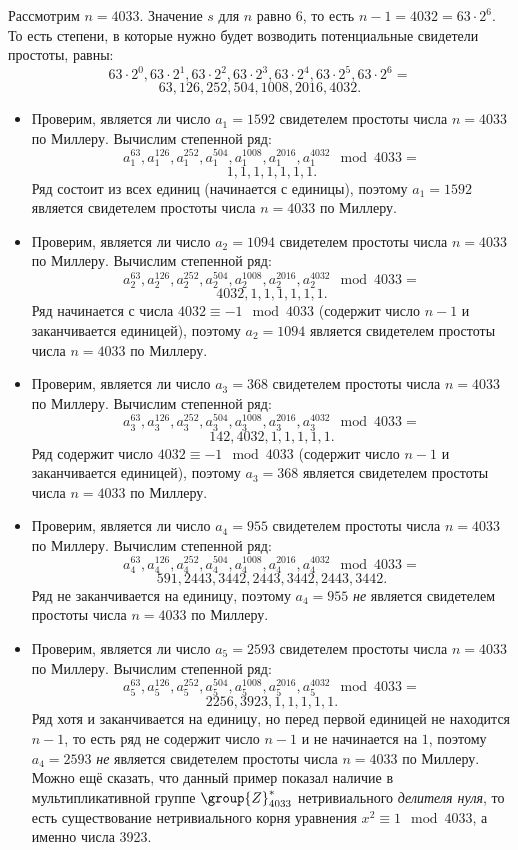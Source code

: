 \example
Рассмотрим $n=4033$. Значение $s$ для $n$ равно $6$, то есть $n - 1 = 4032 = 63 \cdot 2^6$. То есть степени, в которые нужно будет возводить потенциальные свидетели простоты, равны:
\[ 63 \cdot 2^0, 63 \cdot 2^1, 63 \cdot 2^2, 63 \cdot 2^3, 63 \cdot 2^4, 63 \cdot 2^5, 63 \cdot 2^6= \]
\[ 63, 126, 252, 504, 1008, 2016, 4032. \]
\begin{itemize}
	\item Проверим, является ли число $a_1 = 1592$ свидетелем простоты числа $n = 4033$ по Миллеру. Вычислим степенной ряд:
		\[ a_1^{63}, a_1^{126}, a_1^{252}, a_1^{504}, a_1^{1008}, a_1^{2016}, a_1^{4032} \mod 4033 = \]
		\[ 1, 1, 1, 1, 1, 1, 1. \]
		Ряд состоит из всех единиц (начинается с единицы), поэтому $a_1 = 1592$ является свидетелем простоты числа $n = 4033$ по Миллеру.
	\item Проверим, является ли число $a_2 = 1094$ свидетелем простоты числа $n = 4033$ по Миллеру. Вычислим степенной ряд:
		\[ a_2^{63}, a_2^{126}, a_2^{252}, a_2^{504}, a_2^{1008}, a_2^{2016}, a_2^{4032} \mod 4033 =\]
		\[ 4032, 1, 1, 1, 1, 1, 1. \]
		Ряд начинается с числа $4032 \equiv -1 \mod 4033$ (содержит число $n-1$ и заканчивается единицей), поэтому $a_2 = 1094$ является свидетелем простоты числа $n = 4033$ по Миллеру.
	\item Проверим, является ли число $a_3 = 368$ свидетелем простоты числа $n = 4033$ по Миллеру. Вычислим степенной ряд:
		\[ a_3^{63}, a_3^{126}, a_3^{252}, a_3^{504}, a_3^{1008}, a_3^{2016}, a_3^{4032} \mod 4033 =\]
		\[ 142, 4032, 1, 1, 1, 1, 1. \]
		Ряд содержит число $4032 \equiv -1 \mod 4033$ (содержит число $n-1$ и заканчивается единицей), поэтому $a_3 = 368$ является свидетелем простоты числа $n = 4033$ по Миллеру.
	\item Проверим, является ли число $a_4 = 955$ свидетелем простоты числа $n = 4033$ по Миллеру. Вычислим степенной ряд:
		\[ a_4^{63}, a_4^{126}, a_4^{252}, a_4^{504}, a_4^{1008}, a_4^{2016}, a_4^{4032} \mod 4033 = \]
		\[ 591, 2443, 3442, 2443, 3442, 2443, 3442. \]
		Ряд не заканчивается на единицу, поэтому $a_4 = 955$ \emph{не} является свидетелем простоты числа $n = 4033$ по Миллеру.
	\item Проверим, является ли число $a_5 = 2593$ свидетелем простоты числа $n = 4033$ по Миллеру. Вычислим степенной ряд:
		\[ a_5^{63}, a_5^{126}, a_5^{252}, a_5^{504}, a_5^{1008}, a_5^{2016}, a_5^{4032} \mod 4033 =\]
		\[ 2256, 3923, 1, 1, 1, 1, 1. \]
		Ряд хотя и заканчивается на единицу, но перед первой единицей не находится $n-1$, то есть ряд не содержит число $n-1$ и не начинается на $1$, поэтому $a_4 = 2593$ \emph{не} является свидетелем простоты числа $n = 4033$ по Миллеру. Можно ещё сказать, что данный пример показал наличие в мультипликативной группе $\group{Z}_{4033}^{*}$ нетривиального \emph{делителя нуля}, то есть существование нетривиального корня уравнения $ x^2 \equiv 1 \mod 4033$, а именно числа 3923.
\end{itemize}
\exampleend

